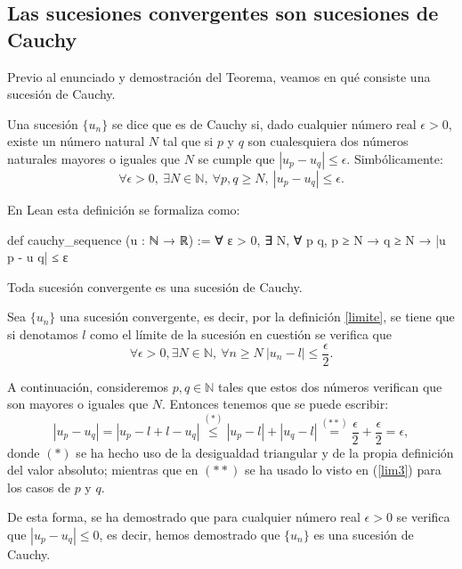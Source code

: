 \subsection{Las sucesiones convergentes son sucesiones de Cauchy}
Previo al enunciado y demostración del Teorema, veamos en qué 
consiste una sucesión de Cauchy.
\begin{definicion}
	Una sucesión \(\{u_n\}\) se dice que es de Cauchy si, 
	dado cualquier número real \(\epsilon >0\),
	existe un número natural \(N\) tal que si \(p\) y \(q\) son 
	cualesquiera dos números naturales mayores o iguales que 
	\(N\) se cumple que \(|u_p-u_q| \leq \epsilon \). 
	Simbólicamente:
	\begin{equation}
	\forall \epsilon >0, \ \exists N \in \mathbb{N}, \ 
	\forall p, q \geq N, \ |u_p-u_q| \leq \epsilon.
	\end{equation}
\end{definicion}
En Lean esta definición se formaliza como:
\begin{leancode}
def cauchy_sequence (u : ℕ → ℝ) := 
∀ ε > 0, ∃ N, ∀ p q, p ≥ N → q ≥ N → |u p - u q| ≤ ε
\end{leancode}
\begin{teorema}
	Toda sucesión convergente es una sucesión de Cauchy.
\end{teorema}
\begin{demostracion}
	Sea \(\{u_n\}\) una sucesión convergente, es decir, 
	por la definición \ref{limite}, se tiene que si denotamos 
	\(l\) como el límite de la sucesión en cuestión se verifica que
\begin{equation}\label{lim3}
\forall \epsilon >0, \exists N \in \mathbb{N}, \  \forall n \geq N \  
|u_n-l| \leq \frac{\epsilon}{2}.
\end{equation}

A continuación, consideremos \(p,q \in \mathbb{N}\) tales 
que estos dos números verifican que son mayores o iguales 
que \(N\). Entonces tenemos que se puede escribir:
\begin{equation*}
|u_p-u_q| = |u_p-l+l-u_q| \stackrel{(*)}{\leq} |u_p-l|+|u_q-l|
\stackrel{(**)}{=} \frac{\epsilon}{2}+\frac{\epsilon}{2}=\epsilon,
\end{equation*}
donde \( (*) \) se ha hecho uso de la desigualdad triangular y de 
la propia definición del valor absoluto; mientras que en \((**)\) 
se ha usado lo visto en (\ref{lim3}) para los casos de \(p\) y \(q\).

De esta forma, se ha demostrado que para cualquier número real \(\epsilon >0\) 
se verifica que \( |u_p-u_q| \leq 0\), es decir, hemos demostrado 
que \(\{u_n\}\) es una sucesión de Cauchy.
\end{demostracion}


